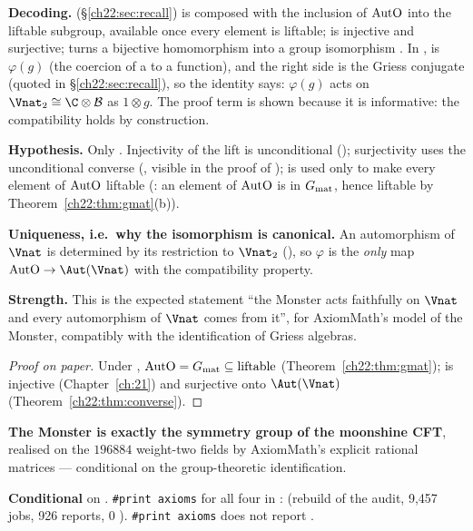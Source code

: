 \begin{dictionary}
\textbf{Decoding.}   (\S\ref{ch22:sec:recall}) is  composed with
the inclusion of $\mathrm{AutO}$ into the liftable subgroup, available once every element is liftable;
 is injective and surjective;  turns a bijective homomorphism into a group
isomorphism .  In ,  is $\varphi(g)$ (the
coercion of a  to a function), and the right side is the Griess conjugate (quoted in \S\ref{ch22:sec:recall}),
so the identity says: $\varphi(g)$ acts on $\Vnat_2\cong\C\otimes\chtwentytwoB$ as $1\otimes g$.  The proof term
 is shown because it is informative: the compatibility holds by construction.

\textbf{Hypothesis.}  Only .  Injectivity of the lift is unconditional ();
surjectivity uses the unconditional converse (, visible in the
proof of );  is used only to make every element of $\mathrm{AutO}$ liftable
(: an element of $\mathrm{AutO}$ is in $G_{\mathrm{mat}}$, hence liftable by
Theorem~\ref{ch22:thm:gmat}(b)).

\textbf{Uniqueness, i.e.\ why the isomorphism is canonical.}  An automorphism of $\Vnat$ is determined by its restriction to
$\Vnat_2$ (), so $\varphi$ is the \emph{only} map $\chtwentytwoAutO\to\Aut(\Vnat)$ with
the compatibility property.

\textbf{Strength.}  This is the expected statement ``the Monster acts faithfully on $\Vnat$ and every automorphism of $\Vnat$
comes from it'', for AxiomMath's model of the Monster, compatibly with the identification of Griess algebras.
\end{dictionary}
\begin{proof}[Proof on paper]
Under , $\mathrm{AutO}=G_{\mathrm{mat}}\subseteq\mathrm{liftable}$ (Theorem~\ref{ch22:thm:gmat}); 
is injective (Chapter~\ref{ch:21}) and surjective onto $\Aut(\Vnat)$ (Theorem~\ref{ch22:thm:converse}).
\end{proof}
\begin{physics}
\textbf{The Monster is exactly the symmetry group of the moonshine CFT}, realised on the $196884$ weight-two fields by
AxiomMath's explicit rational matrices --- conditional on the group-theoretic identification.
\end{physics}
\begin{status}
\textbf{Conditional} on .  \texttt{\#print axioms} for all four in :
 (rebuild of the audit, 9,457 jobs, 926 reports, $0$ ).  \texttt{\#print axioms} does not report .
\end{status}

